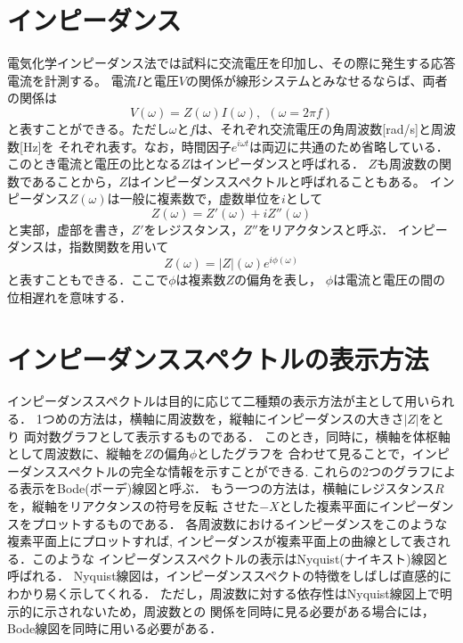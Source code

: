\section{インピーダンス}
電気化学インピーダンス法では試料に交流電圧を印加し、その際に発生する応答電流を計測する。
電流$I$と電圧$V$の関係が線形システムとみなせるならば、両者の関係は
\begin{equation}
	V(\omega)= Z(\omega) I(\omega), \ \ (\omega=2\pi f)
	\label{eqn:I2V}
\end{equation}
と表すことができる。ただし$\omega$と$f$は、それぞれ交流電圧の角周波数[rad/s]と周波数[Hz]を
それぞれ表す。なお，時間因子$e^{i\omega t}$は両辺に共通のため省略している．
このとき電流と電圧の比となる$Z$はインピーダンスと呼ばれる．
$Z$も周波数の関数であることから，$Z$はインピーダンススペクトルと呼ばれることもある。
インピーダンス$Z(\omega)$は一般に複素数で，虚数単位を$i$として
\begin{equation}
	Z(\omega)=Z'(\omega)+iZ''(\omega)
	\label{eqn:Z_cmplx}
\end{equation}
と実部，虚部を書き，$Z'$をレジスタンス，$Z''$をリアクタンスと呼ぶ．
インピーダンスは，指数関数を用いて
\begin{equation}
	Z(\omega)=\left| Z \right|(\omega)e ^{i\phi(\omega)}
	\label{eqn:}
\end{equation}
と表すこともできる．ここで$\phi$は複素数$Z$の偏角を表し，
$\phi$は電流と電圧の間の位相遅れを意味する．
%
\section{インピーダンススペクトルの表示方法}
インピーダンススペクトルは目的に応じて二種類の表示方法が主として用いられる．
1つめの方法は，横軸に周波数を，縦軸にインピーダンスの大きさ$|Z|$をとり
両対数グラフとして表示するものである．
このとき，同時に，横軸を体枢軸として周波数に、縦軸を$Z$の偏角$\phi$としたグラフを
合わせて見ることで，インピーダンススペクトルの完全な情報を示すことができる.
これらの2つのグラフによる表示をBode(ボーデ)線図と呼ぶ．
もう一つの方法は，横軸にレジスタンス$R$を，縦軸をリアクタンスの符号を反転
させた$-X$とした複素平面にインピーダンスをプロットするものである．
各周波数におけるインピーダンスをこのような複素平面上にプロットすれば,
インピーダンスが複素平面上の曲線として表される．このような
インピーダンススペクトルの表示はNyquist(ナイキスト)線図と呼ばれる．
Nyquist線図は，インピーダンススペクトの特徴をしばしば直感的にわかり易く示してくれる．
ただし，周波数に対する依存性はNyquist線図上で明示的に示されないため，周波数との
関係を同時に見る必要がある場合には，Bode線図を同時に用いる必要がある．
%
